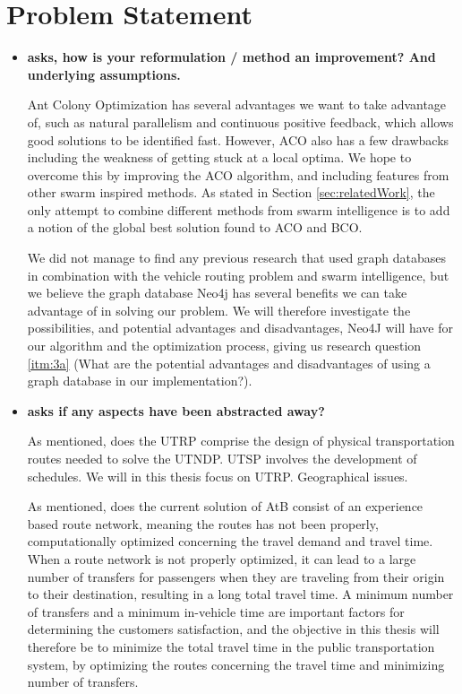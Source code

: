 \section{Problem Statement}

\begin{itemize}
\item \citet{cohen88} \textbf{asks, how is your reformulation / method an improvement? And underlying assumptions.}

Ant Colony Optimization has several advantages we want to take advantage of, such as natural parallelism and continuous positive feedback, which allows good solutions to be identified fast. However, ACO also has a few drawbacks including the weakness of getting stuck at a local optima. We hope to overcome this by improving the ACO algorithm, and including features from other swarm inspired methods. As stated in Section \vref{sec:relatedWork}, the only attempt to combine different methods from swarm intelligence is to add a notion of the global best solution found to ACO and BCO. 

We did not manage to find any previous research that used graph databases in combination with the vehicle routing problem and swarm intelligence, but we believe the graph database Neo4j \citep{website:neo4j} has several benefits we can take advantage of in solving our problem. We will therefore investigate the possibilities, and potential advantages and disadvantages, Neo4J will have for our algorithm and the optimization process, giving us research question \vref{itm:3a} (What are the potential advantages and disadvantages of using a graph database in our implementation?).

\item \citet{cohen88} \textbf{asks if any aspects have been abstracted away?}

As mentioned, does the UTRP comprise the design of physical transportation routes needed to solve the UTNDP. UTSP involves the development of schedules. We will in this thesis focus on UTRP. Geographical issues.

As mentioned, does the current solution of AtB consist of an experience based route network, meaning the routes has not been properly, computationally optimized concerning the travel demand and travel time. When a route network is not properly optimized, it can lead to a large number of transfers for passengers when they are traveling from their origin to their destination, resulting in a long total travel time. A minimum number of transfers and a minimum in-vehicle time are important factors for determining the customers satisfaction, and the objective in this thesis will therefore be to minimize the total travel time in the public transportation system, by optimizing the routes concerning the travel time and minimizing number of transfers.


\end{itemize}
